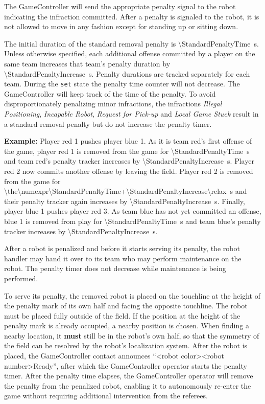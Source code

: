 The GameController will send the appropriate penalty signal to the robot indicating the infraction committed. After a penalty is signaled to the robot, it is not allowed to move in any fashion except for standing up or sitting down.

The initial duration of the standard removal penalty is \qty{\StandardPenaltyTime}{\second}. Unless otherwise specified, each additional offense committed by a player on the same team increases that team's penalty duration by  \qty{\StandardPenaltyIncrease}{\second}. Penalty durations are tracked separately for each team. During the \texttt{set} state the penalty time counter will not decrease. The GameController will keep track of the time of the penalty. To avoid disproportionately penalizing minor infractions, the infractions \emph{Illegal Positioning}, \emph{Incapable Robot}, \emph{Request for Pick-up} and \emph{Local Game Stuck} result in a standard removal penalty but do not increase the penalty timer.

\textbf{Example: } Player red 1 pushes player blue 1. As it is team red's first offense of the game, player red 1 is removed from the game for \qty{\StandardPenaltyTime}{\second} and team red's penalty tracker increases by \qty{\StandardPenaltyIncrease}{\second}. Player red 2 now commits another offense by leaving the field. Player red 2 is removed from the game for \qty{\the\numexpr\StandardPenaltyTime+\StandardPenaltyIncrease\relax}{\second} and their penalty tracker again increases by \qty{\StandardPenaltyIncrease}{\second}. Finally, player blue 1 pushes player red 3. As team blue has not yet committed an offense, blue 1 is removed from play for  \qty{\StandardPenaltyTime}{\second} and team blue's penalty tracker increases by \qty{\StandardPenaltyIncrease}{\second}.

After a robot is penalized and before it starts serving its penalty, the robot handler may hand it over to its team who may perform maintenance on the robot. The penalty timer does not decrease while maintenance is being performed.

To serve its penalty, the removed robot is placed on the touchline at the height of the penalty mark of its own half and facing the opposite touchline. The robot must be placed fully outside of the field. If the position at the height of the penalty mark is already occupied, a nearby position is chosen. When finding a nearby location, it \textbf{must} still be in the robot's own half, so that the symmetry of the field can be resolved by the robot's localization system. After the robot is placed, the GameController contact announces ``\textless robot color\textgreater \textless robot number\textgreater Ready'', after which the GameController operator starts the penalty timer. After the penalty time elapses, the GameController operator will remove the penalty from the penalized robot, enabling it to autonomously re-enter the game without requiring additional intervention from the referees.


